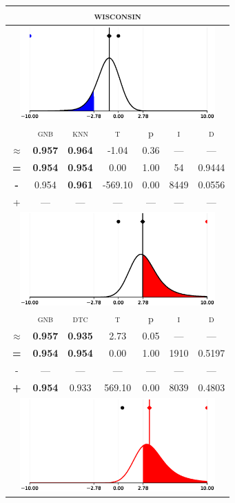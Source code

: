 \begin{tabular}{c||cc||c|c|c||c}
	\toprule
	\multicolumn{7}{c}{\textsc{wisconsin}}\\
	\bottomrule
	\multicolumn{7}{c}{\includegraphics[width=7.5cm, trim=30 0 30 0]{figures/wisconsin_0.eps}}\\

\midrule	&\textsc{gnb} & \textsc{knn} & \textsc{t} & p & \textsc{i} & \textsc{d}\\
	\color{black} $\approx$ & \color{black} \bfseries 0.957 &\color{black}  \bfseries 0.964 & -1.04 & 0.36 & --- & ---\\\midrule
	{\bfseries\color{black}\tiny=}& \color{black} \bfseries 0.954 & \color{black} \bfseries 0.954 & 0.00 & 1.00 & 54 & \color{black} 0.9444\\
	{\bfseries\color{blue}\tiny-}& \color{blue}  0.954 & \color{blue} \bfseries 0.961 & -569.10 & 0.00 & 8449 & \color{blue} 0.0556\\
	{\tiny+}& --- & --- & --- & --- & --- & ---\\
	\bottomrule
	\multicolumn{7}{c}{\includegraphics[width=7.5cm, trim=30 0 30 0]{figures/wisconsin_1.eps}}\\

\midrule	&\textsc{gnb} & \textsc{dtc} & \textsc{t} & p & \textsc{i} & \textsc{d}\\
	\color{black} $\approx$ & \color{black} \bfseries 0.957 &\color{black}  \bfseries 0.935 & 2.73 & 0.05 & --- & ---\\\midrule
	{\bfseries\color{black}\tiny=}& \color{black} \bfseries 0.954 & \color{black} \bfseries 0.954 & 0.00 & 1.00 & 1910 & \color{black} 0.5197\\
	{\tiny-}& --- & --- & --- & --- & --- & ---\\
	{\bfseries\color{red}\tiny+}& \color{red} \bfseries 0.954 & \color{red}  0.933 & 569.10 & 0.00 & 8039 & \color{red} 0.4803\\
	\bottomrule
	\multicolumn{7}{c}{\includegraphics[width=7.5cm, trim=30 0 30 0]{figures/wisconsin_2.eps}}\\


\end{tabular}
